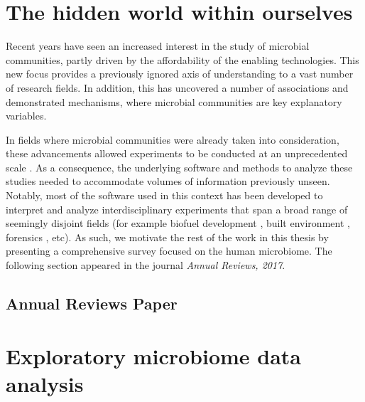 \documentclass[12pt,chapterheads]{ucsd}
\begin{document}
%




\chapter{The hidden world within ourselves}\label{chapter_review}

Recent years have seen an increased interest in the study of microbial
communities, partly driven by the affordability of the enabling technologies.
This new focus provides a previously ignored axis of understanding to a vast
number of research fields. In addition, this has uncovered a number of
associations and demonstrated mechanisms, where microbial communities are key
explanatory variables.

In fields where microbial communities were already taken into consideration,
these advancements allowed experiments to be conducted at an unprecedented
scale \cite{RN35, RN4061, RN4267}. As a consequence, the underlying software
and methods to analyze these studies needed to accommodate volumes of
information previously unseen. Notably, most of the software used in this
context has been developed to interpret and analyze interdisciplinary
experiments that span a broad range of seemingly disjoint fields (for example
biofuel development \cite{RN4268}, built environment \cite{RN4270, RN4083},
forensics \cite{RN4269, RN4271}, etc).  As such, we motivate the rest of the
work in this thesis by presenting a comprehensive survey focused on the human 
microbiome.  The following section appeared in the journal
\textsl{Annual Reviews, 2017}.

\ifdefined\RELEASE
    
\else
    \section{Annual Reviews Paper}
\fi

\chapter{Exploratory microbiome data analysis}\label{exploratory_chapter}
\end{document}
